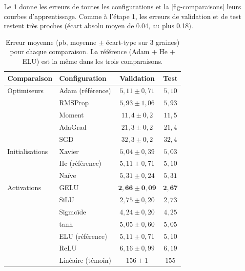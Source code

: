 Le \cref{tab-entrainement} donne les erreurs de toutes les configurations et la \cref{fig-comparaisons} leurs
courbes d'apprentissage. Comme à l'étape 1, les erreurs de validation et de test restent très proches (écart
absolu moyen de \num{0.04}\pb, au plus \num{0.18}\pb).

\begin{table}[H]
  \centering
  \caption{Erreur moyenne (pb, moyenne $\pm$ écart-type sur 3 graines) pour chaque comparaison. La référence
  (Adam + He + ELU) est la même dans les trois comparaisons.}
  \label{tab-entrainement}
  \small
  \begin{tabular}{llcc}
    \toprule
    Comparaison & Configuration & Validation & Test \\
    \midrule
    Optimiseurs     & Adam (référence)  & $5{,}11 \pm 0{,}71$ & $5{,}10$ \\
                    & RMSProp           & $5{,}93 \pm 1{,}06$ & $5{,}93$ \\
                    & Moment            & $11{,}4 \pm 0{,}2$  & $11{,}5$ \\
                    & AdaGrad           & $21{,}3 \pm 0{,}2$  & $21{,}4$ \\
                    & SGD               & $32{,}3 \pm 0{,}2$  & $32{,}4$ \\
    \midrule
    Initialisations & Xavier            & $5{,}04 \pm 0{,}39$ & $5{,}03$ \\
                    & He (référence)    & $5{,}11 \pm 0{,}71$ & $5{,}10$ \\
                    & Naïve             & $5{,}31 \pm 0{,}24$ & $5{,}31$ \\
    \midrule
    Activations     & GELU              & $\mathbf{2{,}66 \pm 0{,}09}$ & $\mathbf{2{,}67}$ \\
                    & SiLU              & $2{,}75 \pm 0{,}20$ & $2{,}73$ \\
                    & Sigmoïde          & $4{,}24 \pm 0{,}20$ & $4{,}25$ \\
                    & tanh              & $5{,}05 \pm 0{,}60$ & $5{,}05$ \\
                    & ELU (référence)   & $5{,}11 \pm 0{,}71$ & $5{,}10$ \\
                    & ReLU              & $6{,}16 \pm 0{,}99$ & $6{,}19$ \\
                    & Linéaire (témoin) & $156 \pm 1$         & $155$ \\
    \bottomrule
  \end{tabular}
\end{table}

